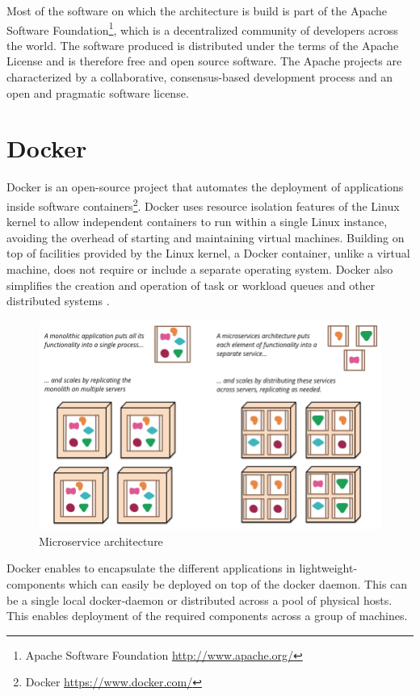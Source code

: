 Most of the software on which the architecture is build is part of the Apache Software Foundation\footnote{Apache Software Foundation \url{http://www.apache.org/}}, which is a decentralized community of developers across the world. The software produced is distributed under the terms of the Apache License and is therefore free and open source software. The Apache projects are characterized by a collaborative, consensus-based development process and an open and pragmatic software license. 

\section{Docker \label{subsec_docker}}

Docker is an open-source project that automates the deployment of applications inside software containers\footnote{Docker \url{https://www.docker.com/}}. Docker uses resource isolation features of the Linux kernel to allow independent containers to run within a single Linux instance, avoiding the overhead of starting and maintaining virtual machines. Building on top of facilities provided by the Linux kernel, a Docker container, unlike a virtual machine, does not require or include a separate operating system. Docker also simplifies the creation and operation of task or workload queues and other distributed systems \cite{docker1,docker2}.

\begin{figure}[ht!]
\centering
\includegraphics[width=\textwidth]{figures/microservice.png}
\caption{Microservice architecture \cite{microservice} \label{fig:microservice}}
\end{figure}

Docker enables to encapsulate the different applications in lightweight-components which can easily be deployed on top of the docker daemon. This can be a single local docker-daemon or distributed across a pool of physical hosts. This enables deployment of the required components across a group of machines.

